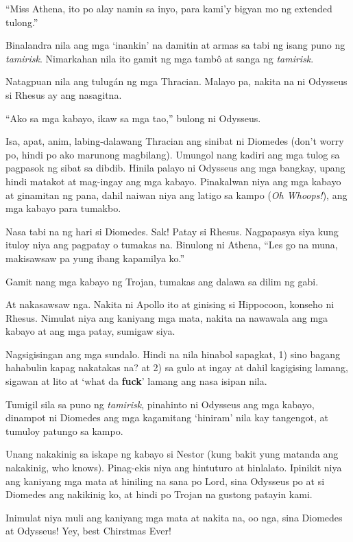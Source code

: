\documentclass[12pt,letterpaper]{report}
\begin{document}
``Miss Athena, ito po alay namin sa inyo, para kami'y bigyan mo ng extended tulong.''

Binalandra nila ang mga `inankin' na damitin at armas sa tabi ng isang puno ng \textit{tamirisk}. Nimarkahan nila ito gamit ng mga tamb\^o at sanga ng \textit{tamirisk}.

Natagpuan nila ang tulug\'an ng mga Thracian. Malayo pa, nakita na ni Odysseus si Rhesus ay ang nasagitna.

``Ako sa mga kabayo, ikaw sa mga tao,'' bulong ni Odysseus.

Isa, apat, anim, labing-dalawang Thracian ang sinibat ni Diomedes (don't worry po, hindi po ako marunong magbilang). Umungol nang kadiri ang mga tulog sa pagpasok ng sibat sa dibdib. Hinila palayo ni Odysseus ang mga bangkay, upang hindi matakot at mag-ingay ang mga kabayo. Pinakalwan niya ang mga kabayo at ginamitan ng pana, dahil naiwan niya ang latigo sa kampo (\textit{Oh Whoops!}), ang mga kabayo para tumakbo.

Nasa tabi na ng hari si Diomedes. Sak! Patay si Rhesus. Nagpapasya siya kung ituloy niya ang pagpatay o tumakas na. Binulong ni Athena, ``Les go na muna, makisawsaw pa yung ibang kapamilya ko.''

Gamit nang mga kabayo ng Trojan, tumakas ang dalawa sa dilim ng gabi.

At nakasawsaw nga. Nakita ni Apollo ito at ginising si Hippocoon, konseho ni Rhesus. Nimulat niya ang kaniyang mga mata, nakita na nawawala ang mga kabayo at ang mga patay, sumigaw siya.

Nagsigisingan ang mga sundalo. Hindi na nila hinabol sapagkat, 1) sino bagang hahabulin kapag  nakatakas na? at 2) sa gulo at ingay at dahil kagigising lamang, sigawan at lito at `what da \textbf{fuck}' lamang ang nasa isipan nila.

Tumigil sila sa puno ng \textit{tamirisk}, pinahinto ni Odysseus ang mga kabayo, dinampot ni Diomedes ang mga kagamitang `hiniram' nila kay tangengot, at tumuloy patungo sa kampo.

Unang nakakinig sa iskape ng kabayo si Nestor (kung bakit yung matanda ang nakakinig, who knows). Pinag-ekis niya ang hintuturo at hinlalato. Ipinikit niya ang kaniyang mga mata at hiniling na sana po Lord, sina Odysseus po at si Diomedes ang nakikinig ko, at hindi po Trojan na gustong patayin kami.

Inimulat niya muli ang kaniyang mga mata at nakita na, oo nga, sina Diomedes at Odysseus! Yey, best Chirstmas Ever!
\end{document}
